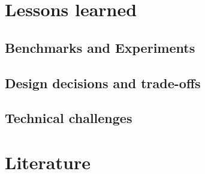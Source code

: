 \documentclass[
        a4paper,     %
        titlepage,   %
        twoside,     %
        parskip      %
        ]{scrartcl}  %
\begin{document}
  \section{Lessons learned}
    \subsection{Benchmarks and Experiments}
    \subsection{Design decisions and trade-offs}
    \subsection{Technical challenges}
    \pagebreak

  \section{Literature}

  \clearpage
  
\end{document}
